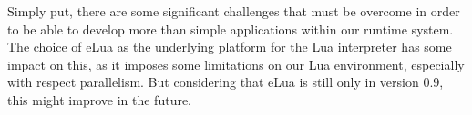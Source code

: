 Simply put, there are some significant challenges that must be overcome in order to be able to develop more than simple applications within our runtime system. The choice of eLua as the underlying platform for the Lua interpreter has some impact on this, as it imposes some limitations on our Lua environment, especially with respect parallelism. But considering that eLua is still only in version 0.9, this might improve in the future.

